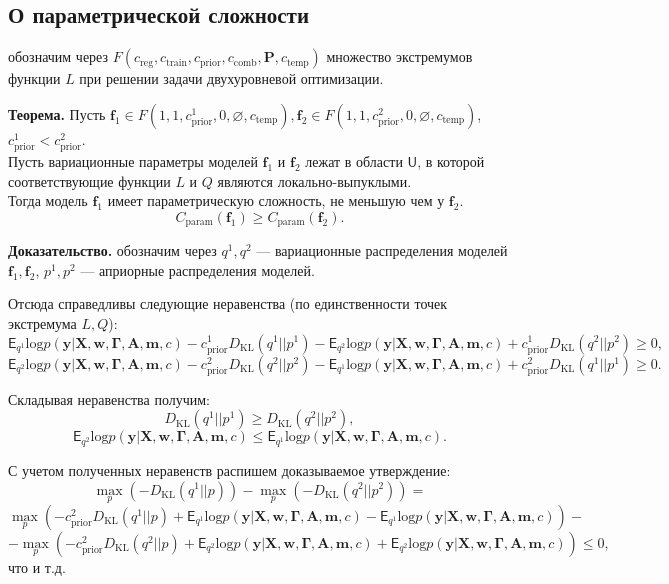 \subsection{О параметрической сложности}
обозначим через $F(c_{\text{reg}}, c_{\text{train}}, c_{\text{prior}}, c_{\text{comb}}, \mathbf{P}, c_{\text{temp}})$ множество экстремумов функции $L$ при решении задачи двухуровневой оптимизации.


\textbf{Теорема.}  
Пусть $\mathbf{f}_1 \in F(1, 1, c_{\text{prior}}^1, 0, \varnothing,  c_{\text{temp}} ), \mathbf{f}_2 \in F(1, 1, c_{\text{prior}}^2, 0, \varnothing,  c_{\text{temp}})$, $c_{\text{prior}}^1 < c_{\text{prior}}^2$.\\
Пусть вариационные параметры моделей $\mathbf{f}_1$ и $\mathbf{f}_2$ лежат в области $\mathsf{U}$, в которой соответствующие функции $L$ и $Q$ являются локально-выпуклыми.\\ 
Тогда модель $\mathbf{f}_1$ имеет параметрическую сложность, не меньшую чем у $\mathbf{f}_2$.
\[
    C_\text{param}(\mathbf{f}_1) \geq C_\text{param}(\mathbf{f}_2).
\]

\textbf{Доказательство.}
обозначим через $q^1, q^2$ --- вариационные распределения моделей $\mathbf{f}_1, \mathbf{f}_2$, 
$p^1, p^2$ --- априорные распределения моделей.
 
 Отсюда справедливы следующие неравенства (по единственности точек экстремума $L,Q$):
\[
    \mathsf{E}_{q^1}\text{log} p(\mathbf{y}|\mathbf{X},\mathbf{w}, \boldsymbol{\Gamma}, \mathbf{A},\mathbf{m}, c) - c_{\text{prior}}^1  D_\text{KL}(q^1||p^1)  -  \mathsf{E}_{q^2}\text{log} p(\mathbf{y}|\mathbf{X},\mathbf{w}, \boldsymbol{\Gamma}, \mathbf{A},\mathbf{m}, c) + c_{\text{prior}}^1  D_\text{KL}(q^2||p^2) \geq 0,
\]
\[
    \mathsf{E}_{q^2}\text{log} p(\mathbf{y}|\mathbf{X},\mathbf{w}, \boldsymbol{\Gamma}, \mathbf{A},\mathbf{m}, c) - c_{\text{prior}}^2  D_\text{KL}(q^2||p^2)  -  \mathsf{E}_{q^1}\text{log} p(\mathbf{y}|\mathbf{X},\mathbf{w}, \boldsymbol{\Gamma}, \mathbf{A},\mathbf{m}, c) + c_{\text{prior}}^2  D_\text{KL}(q^1||p^1) \geq 0.
\]

Складывая неравенства получим:
\[
    D_\text{KL}(q^1||p^1) \geq D_\text{KL}(q^2||p^2),
\]
\[
    \mathsf{E}_{q^2}\text{log} p(\mathbf{y}|\mathbf{X},\mathbf{w}, \boldsymbol{\Gamma}, \mathbf{A},\mathbf{m}, c)  \leq \mathsf{E}_{q^1}\text{log} p(\mathbf{y}|\mathbf{X},\mathbf{w}, \boldsymbol{\Gamma}, \mathbf{A},\mathbf{m}, c) .
\]

С учетом полученных неравенств распишем доказываемое утверждение:
\[
    \max_p \left(-D_\text{KL}(q^1||p)\right) - \max_{p} \left(-D_\text{KL}(q^2||p^2)\right) = 
\]
\[ \max_p  \left(-c_{\text{prior}}^2 D_\text{KL}(q^1||p) +\mathsf{E}_{q^1}\text{log} p(\mathbf{y}|\mathbf{X},\mathbf{w}, \boldsymbol{\Gamma}, \mathbf{A},\mathbf{m}, c) - \mathsf{E}_{q^1}\text{log} p(\mathbf{y}|\mathbf{X},\mathbf{w}, \boldsymbol{\Gamma}, \mathbf{A},\mathbf{m}, c) \right) -
\]
\[  - \max_{p} \left(-c_{\text{prior}}^2 D_\text{KL}(q^2||p)  + \mathsf{E}_{q^2}\text{log} p(\mathbf{y}|\mathbf{X},\mathbf{w}, \boldsymbol{\Gamma}, \mathbf{A},\mathbf{m}, c) +\mathsf{E}_{q^2}\text{log} p(\mathbf{y}|\mathbf{X},\mathbf{w}, \boldsymbol{\Gamma}, \mathbf{A},\mathbf{m}, c)  \right)    \leq 0,  
\]
что и т.д.
\clearpage

